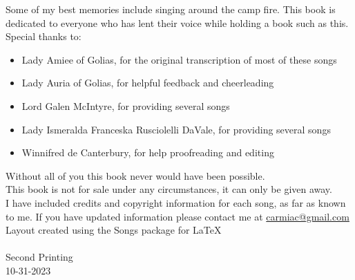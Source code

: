 \vspace*{\baselineskip}

Some of my best memories include singing around the camp fire. This book is dedicated to everyone who has lent their voice while holding a book such as this.\\

Special thanks to:\\
\begin{itemize}
  \item Lady Amiee of Golias, for the original transcription of most of these songs
  \item Lady Auria of Golias, for helpful feedback and cheerleading
  \item Lord Galen McIntyre, for providing several songs
  \item Lady Ismeralda Franceska Rusciolelli DaVale, for providing several songs
  \item Winnifred de Canterbury, for help proofreading and editing 
\end{itemize}
Without all of you this book never would have been possible. \\

This book is not for sale under any circumstances, it can only be given away.\\

I have included credits and copyright information for each song, as far as known to me. If you have updated information please contact me at  \href{mailto:carmiac@gmail.com}{carmiac@gmail.com}\\

Layout created using the Songs package for \LaTeX   
\\
\\

\center
Second Printing \\

10-31-2023 \\

\clearpage

